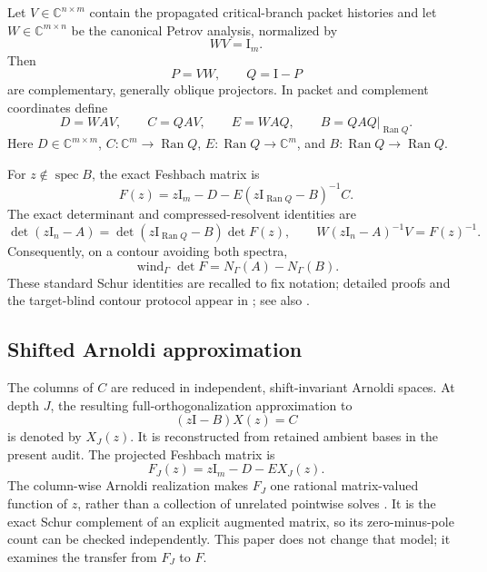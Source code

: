 \documentclass[11pt]{article}
\theoremstyle{definition}
\theoremstyle{remark}
\newcommand{\C}{\mathbb C}
\newcommand{\Id}{\mathrm I}
\newcommand{\Ran}{\operatorname{Ran}}
\newcommand{\spec}{\operatorname{spec}}
\newcommand{\wind}{\operatorname{wind}}
\begin{document}
Let \(V\in\C^{n\times m}\) contain the propagated critical-branch packet
histories and let \(W\in\C^{m\times n}\) be the canonical Petrov analysis,
normalized by
\begin{equation}
 WV=\Id_m.
 \label{eq:wv}
\end{equation}
Then
\[
 P=VW,\qquad Q=\Id-P
\]
are complementary, generally oblique projectors.  In packet and complement
coordinates define
\begin{equation}
 D=WAV,\qquad C=QAV,\qquad E=WAQ,
 \qquad B=QAQ\big|_{\Ran Q}.
 \label{eq:blocks}
\end{equation}
Here \(D\in\C^{m\times m}\), \(C:\C^m\to\Ran Q\),
\(E:\Ran Q\to\C^m\), and \(B:\Ran Q\to\Ran Q\).

For \(z\notin\spec B\), the exact Feshbach matrix is
\begin{equation}
 F(z)=z\Id_m-D-E(z\Id_{\Ran Q}-B)^{-1}C.
 \label{eq:exact-f}
\end{equation}
The exact determinant and compressed-resolvent identities are
\begin{equation}
 \det(z\Id_n-A)=\det(z\Id_{\Ran Q}-B)\det F(z),
 \qquad W(z\Id_n-A)^{-1}V=F(z)^{-1}.
 \label{eq:feshbach-identities}
\end{equation}
Consequently, on a contour avoiding both spectra,
\begin{equation}
 \wind_\Gamma\det F=N_\Gamma(A)-N_\Gamma(B).
 \label{eq:exact-count}
\end{equation}
These standard Schur identities are recalled to fix notation; detailed
proofs and the target-blind contour protocol appear in
\citet{WangContourFeshbach2026}; see also \citet{Zhang2005}.

\subsection{Shifted Arnoldi approximation}

The columns of \(C\) are reduced in independent, shift-invariant Arnoldi
spaces.  At depth \(J\), the resulting full-orthogonalization approximation
to
\[
 (z\Id-B)X(z)=C
\]
is denoted by \(X_J(z)\).  It is reconstructed from retained ambient bases
in the present audit.  The projected Feshbach matrix is
\begin{equation}
 F_J(z)=z\Id_m-D-EX_J(z).
 \label{eq:fj}
\end{equation}
The column-wise Arnoldi realization makes \(F_J\) one rational
matrix-valued function of \(z\), rather than a collection of unrelated
pointwise solves \citep{Saad1980,Saad2003}.  It is the exact Schur
complement of an explicit augmented matrix, so its zero-minus-pole count can
be checked independently.  This paper does not change that model; it
examines the transfer from \(F_J\) to \(F\).
\end{document}
